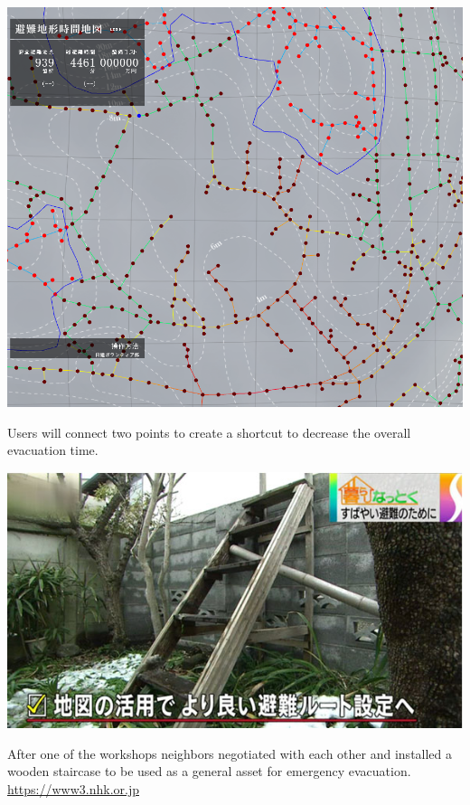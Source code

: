 \begin{marginfigure}[{0cm}]
  \includegraphics[width=\textwidth]{chapters/3/fig/nigechizu001.png}               
  \caption[zoom in nigechizu interface]{Users will connect two points to create a shortcut to decrease the overall evacuation time.}
  \label{fig:nigechizu}
\end{marginfigure}

\begin{marginfigure}[{0cm}]
  \includegraphics[width=\textwidth]{chapters/3/fig/nhk_kamakura.jpg}               
  \caption[collective collaboration]{After one of the workshops neighbors
  negotiated with each other and installed a wooden staircase to be used as
a general asset for emergency evacuation. \url{https://www3.nhk.or.jp}}
  \label{fig:nigechizu}
\end{marginfigure}


